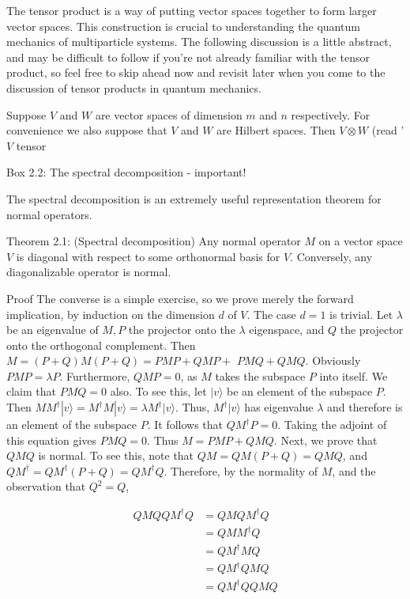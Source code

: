 \documentclass[
	11pt, %
	fleqn, %
	a4paper, %
]{LegrandOrangeBook}
\begin{document}
The tensor product is a way of putting vector spaces together to form larger vector spaces. This construction is crucial to understanding the quantum mechanics of multiparticle systems. The following discussion is a little abstract, and may be difficult to follow if you're not already familiar with the tensor product, so feel free to skip ahead now and revisit later when you come to the discussion of tensor products in quantum mechanics.

Suppose $V$ and $W$ are vector spaces of dimension $m$ and $n$ respectively. For convenience we also suppose that $V$ and $W$ are Hilbert spaces. Then $V \otimes W$ (read ' $V$ tensor

Box 2.2: The spectral decomposition - important!

The spectral decomposition is an extremely useful representation theorem for normal operators.

Theorem 2.1: (Spectral decomposition) Any normal operator $M$ on a vector space $V$ is diagonal with respect to some orthonormal basis for $V$. Conversely, any diagonalizable operator is normal.

Proof
The converse is a simple exercise, so we prove merely the forward implication, by induction on the dimension $d$ of $V$. The case $d=1$ is trivial. Let $\lambda$ be an eigenvalue of $M, P$ the projector onto the $\lambda$ eigenspace, and $Q$ the projector onto the orthogonal complement. Then $M=(P+Q) M(P+Q)=P M P+Q M P+$ $P M Q+Q M Q$. Obviously $P M P=\lambda P$. Furthermore, $Q M P=0$, as $M$ takes the subspace $P$ into itself. We claim that $P M Q=0$ also. To see this, let $|v\rangle$ be an element of the subspace $P$. Then $M M^{\dagger}|v\rangle=M^{\dagger} M|v\rangle=\lambda M^{\dagger}|v\rangle$. Thus, $M^{\dagger}|v\rangle$ has eigenvalue $\lambda$ and therefore is an element of the subspace $P$. It follows that $Q M^{\dagger} P=0$. Taking the adjoint of this equation gives $P M Q=0$. Thus $M=P M P+Q M Q$. Next, we prove that $Q M Q$ is normal. To see this, note that $Q M=Q M(P+Q)=Q M Q$, and $Q M^{\dagger}=Q M^{\dagger}(P+Q)=Q M^{\dagger} Q$. Therefore, by the normality of $M$, and the observation that $Q^{2}=Q$,

$$
\begin{aligned}
Q M Q Q M^{\dagger} Q & =Q M Q M^{\dagger} Q \\
& =Q M M^{\dagger} Q \\
& =Q M^{\dagger} M Q \\
& =Q M^{\dagger} Q M Q \\
& =Q M^{\dagger} Q Q M Q
\end{aligned}
$$
\end{document}
